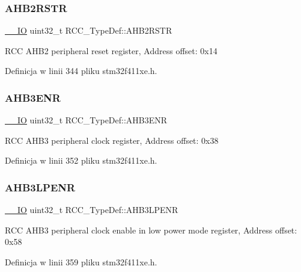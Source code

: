 \subsubsection{\texorpdfstring{A\+H\+B2\+R\+S\+TR}{AHB2RSTR}}
{\footnotesize\ttfamily \hyperlink{core__sc300_8h_aec43007d9998a0a0e01faede4133d6be}{\+\_\+\+\_\+\+IO} uint32\+\_\+t R\+C\+C\+\_\+\+Type\+Def\+::\+A\+H\+B2\+R\+S\+TR}

R\+CC A\+H\+B2 peripheral reset register, Address offset\+: 0x14 

Definicja w linii 344 pliku stm32f411xe.\+h.

\mbox{\label{struct_r_c_c___type_def_ad4ea7be562b42e2ae1a84db44121195d}} 
\subsubsection{\texorpdfstring{A\+H\+B3\+E\+NR}{AHB3ENR}}
{\footnotesize\ttfamily \hyperlink{core__sc300_8h_aec43007d9998a0a0e01faede4133d6be}{\+\_\+\+\_\+\+IO} uint32\+\_\+t R\+C\+C\+\_\+\+Type\+Def\+::\+A\+H\+B3\+E\+NR}

R\+CC A\+H\+B3 peripheral clock register, Address offset\+: 0x38 

Definicja w linii 352 pliku stm32f411xe.\+h.

\mbox{\label{struct_r_c_c___type_def_a95edda857c3725bfb410d3a4707edfd8}} 
\subsubsection{\texorpdfstring{A\+H\+B3\+L\+P\+E\+NR}{AHB3LPENR}}
{\footnotesize\ttfamily \hyperlink{core__sc300_8h_aec43007d9998a0a0e01faede4133d6be}{\+\_\+\+\_\+\+IO} uint32\+\_\+t R\+C\+C\+\_\+\+Type\+Def\+::\+A\+H\+B3\+L\+P\+E\+NR}

R\+CC A\+H\+B3 peripheral clock enable in low power mode register, Address offset\+: 0x58 

Definicja w linii 359 pliku stm32f411xe.\+h.

\mbox{\label{struct_r_c_c___type_def_a39a90d838fbd0b8515f03e4a1be6374f}} 
